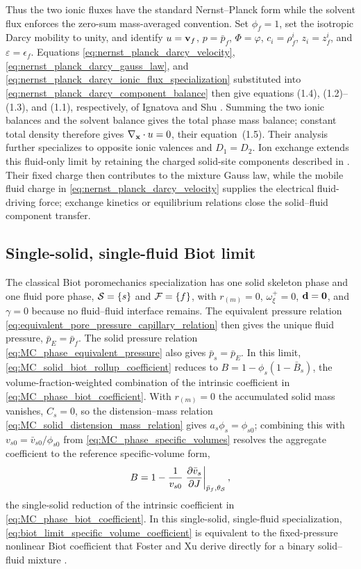 %
Thus the two ionic fluxes have the standard Nernst--Planck form while the
solvent flux enforces the zero-sum mass-averaged convention.  Set \(\phi_f=1\),
set the isotropic Darcy mobility to unity, and identify
\(u=\mathbf{v}_f\), \(p=\bar p_f\), \(\Phi=\varphi\), \(c_i=\rho_f^i\),
\(z_i=z_f^i\), and \(\varepsilon=\epsilon_f\).  Equations
\eqref{eq:nernst_planck_darcy_velocity},
\eqref{eq:nernst_planck_darcy_gauss_law}, and
\eqref{eq:nernst_planck_darcy_ionic_flux_specialization} substituted into
\eqref{eq:nernst_planck_darcy_component_balance} then give equations
(1.4), (1.2)--(1.3), and (1.1), respectively, of Ignatova and Shu
\cite{ignatova2021charged_fluids}.  Summing the two ionic balances and the
solvent balance gives the total phase mass balance; constant total density
therefore gives \(\nabla_{\mathbf{x}}\cdot u=0\), their equation~(1.5).  Their
analysis further specializes to opposite ionic valences and \(D_1=D_2\).
Ion exchange extends this fluid-only limit by retaining the charged solid-site
components described in .  Their fixed charge then
contributes to the mixture Gauss law, while the mobile fluid charge in
\eqref{eq:nernst_planck_darcy_velocity} supplies the electrical fluid-driving
force; exchange kinetics or equilibrium relations close the solid--fluid
component transfer.

\subsection{Single-solid, single-fluid Biot limit}
\label{sec:single_solid_single_fluid_biot_limit}

The classical Biot poromechanics specialization has one solid skeleton phase
and one fluid pore phase, \(\mathcal{S}=\{s\}\) and \(\mathcal{F}=\{f\}\), with
\(r_{(m)}=0\), \(\omega_\xi^+=0\), \(\mathbf{d}=\mathbf{0}\), and
\(\gamma=0\) because no fluid--fluid interface remains.  The equivalent
pressure relation \eqref{eq:equivalent_pore_pressure_capillary_relation} then
gives the unique fluid pressure,
\(\bar p_E=\bar p_f\).  The solid pressure relation
\eqref{eq:MC_phase_equivalent_pressure} also gives
\(\bar p_s=\bar p_E\).  In this limit,
\eqref{eq:MC_solid_biot_rollup_coefficient} reduces to
\(B=1-\phi_s(1-\bar B_s)\), the volume-fraction-weighted combination of the
intrinsic coefficient in \eqref{eq:MC_phase_biot_coefficient}.  With
\(r_{(m)}=0\) the accumulated solid mass vanishes, \(C_s=0\), so the
distension--mass relation \eqref{eq:MC_solid_distension_mass_relation} gives
\(a_s\phi_s=\phi_{s0}\); combining this with \(v_{s0}=\bar v_{s0}/\phi_{s0}\)
from \eqref{eq:MC_phase_specific_volumes} resolves the aggregate coefficient
to the reference specific-volume form,
%
\begin{equation}
	B
	=
	1
	-
	\frac{1}{v_{s0}}
	\left.
	\frac{\partial \bar v_s}{\partial J}
	\right\vert_{\bar p_f,\theta_{\mathcal{S}}},
	\label{eq:biot_limit_specific_volume_coefficient}
\end{equation}
%
the single-solid reduction of the intrinsic coefficient in
\eqref{eq:MC_phase_biot_coefficient}.  In this single-solid, single-fluid
specialization, \eqref{eq:biot_limit_specific_volume_coefficient} is
equivalent to the fixed-pressure nonlinear Biot coefficient that Foster and Xu
derive directly for a binary solid--fluid mixture
\cite{foster2025}.

